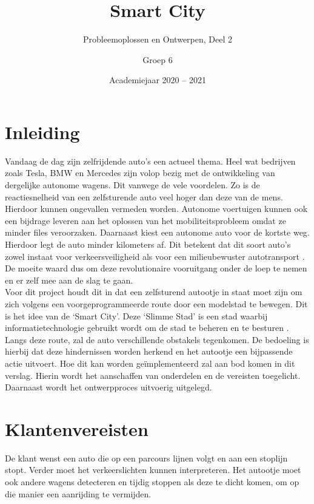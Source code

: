 \documentclass[a4paper,twoside,kulak]{kulakreport} %
\title{Smart City}
\subtitle{Probleemoplossen en Ontwerpen, Deel 2}
\author{Groep 6}
\institute {Aaron Vandenberghe, Dieter Demuynck, Jolien Barbier\\  
	Mathis Bossuyt, Rani Jans en Sarah De Meester \\~\\ 
	o.l.v. Benjamin Maveau, Kevin Truyaert en Martijn Boussé}
\date{Academiejaar 2020 -- 2021}
\begin{document}

\titlepage 
\tableofcontents
\renewcommand\thesection{\arabic{section}}
\renewcommand\thesubsection{\thesection.\arabic{subsection}}
\newpage
\section*{Inleiding}\label{Inleiding}
Vandaag de dag zijn zelfrijdende auto's een actueel thema. Heel wat bedrijven zoals Tesla, BMW en Mercedes zijn volop bezig met de ontwikkeling van dergelijke autonome wagens. Dit vanwege de vele voordelen. Zo is de reactiesnelheid van een zelfsturende auto veel hoger dan deze van de mens. Hierdoor kunnen ongevallen vermeden worden. Autonome voertuigen kunnen ook een bijdrage leveren aan het oplossen van het mobiliteitsprobleem omdat ze minder files veroorzaken. Daarnaast kiest een autonome auto voor de kortste weg. Hierdoor legt de auto minder kilometers af. Dit betekent dat dit soort auto's zowel instaat voor verkeersveiligheid als voor een milieubewuster autotransport \cite{AutonomeAutos1, AutonomeAutos2}. De moeite waard dus om deze revolutionaire vooruitgang onder de loep te nemen en er zelf mee aan de slag te gaan.\\
Voor dit project houdt dit in dat een zelfsturend autootje in staat moet zijn om zich volgens een voorgeprogrammeerde route door een modelstad te bewegen. Dit is het idee van de `Smart City'. Deze `Slimme Stad' is een stad waarbij informatietechnologie gebruikt wordt om de stad te beheren en te besturen \cite{SmartCity}. Langs deze route, zal de auto verschillende obstakels tegenkomen. De bedoeling is hierbij dat deze hindernissen worden herkend en het autootje een bijpassende actie uitvoert. Hoe dit kan worden geïmplementeerd zal aan bod komen in dit verslag. Hierin wordt het aanschaffen van onderdelen en de vereisten toegelicht. Daarnaast wordt het ontwerpproces uitvoerig uitgelegd. 


\section{Klantenvereisten} \label{Klantenvereisten}
De klant wenst een auto die op een parcours lijnen volgt en aan een stoplijn stopt. Verder moet het verkeerslichten kunnen interpreteren. Het autootje moet ook andere wagens detecteren en tijdig stoppen als deze te dicht komen, om op die manier een aanrijding te vermijden. 
\end{document}
